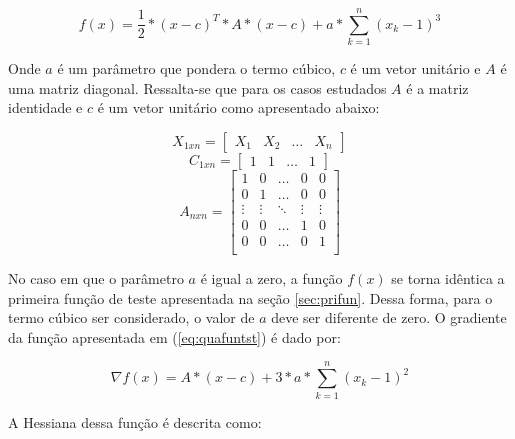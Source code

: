 \begin{equation}\label{eq:quafuntst}
  f(x)= \frac{1}{2}*(x-c)^{T}*A*(x-c)+a*\sum_{k=1}^{n}{(x_k-1)^3}
\end{equation}


Onde $a$ é um parâmetro que pondera o termo cúbico,	$c$ é um vetor unitário e $A$ é uma matriz diagonal. Ressalta-se que para os casos estudados $A$ é a matriz identidade e $c$ é um vetor unitário como apresentado abaixo:

\begin{equation*}
    X_{1xn} = \begin{bmatrix}
                    X_1 & X_2 & \ldots & X_n
                \end{bmatrix}    
\end{equation*}
\begin{equation*}
    C_{1xn} = \begin{bmatrix}
                    1 & 1 & \ldots & 1
                \end{bmatrix}    
\end{equation*}
\begin{equation*}
    A_{nxn} = \begin{bmatrix}
                    1 & 0 & \ldots & 0 & 0 \\
                    0 & 1 & \ldots & 0 & 0 \\
                    \vdots & \vdots & \ddots & \vdots & \vdots \\
                    0 & 0 & \ldots & 1 & 0 \\
                    0 & 0 & \ldots & 0 & 1 \\
                \end{bmatrix}    
\end{equation*}

No caso em que o parâmetro $a$ é igual a zero, a função $f(x)$ se torna idêntica a primeira função de teste apresentada na seção \ref{sec:prifun}. Dessa forma, para o termo cúbico ser considerado, o valor de $a$ deve ser diferente de zero.
O gradiente da função apresentada em (\ref{eq:quafuntst}) é dado por:

\begin{equation}\label{eq:gradquafuntst}
    \nabla f(x) = A*(x-c)+3*a*\sum_{k=1}^{n}{(x_k-1)^2}
\end{equation}

A Hessiana dessa função é descrita como:


